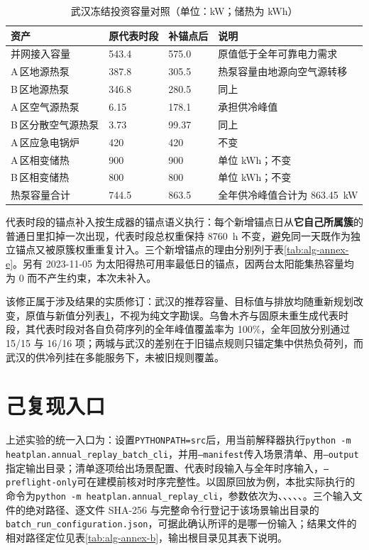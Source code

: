 \documentclass[12pt,a4paper]{article}
\begin{document}
\begin{table}[H]
\centering
\caption{武汉冻结投资容量对照（单位：kW；储热为 kWh）}
\label{tab:alg-annex-e2}
\small
\begin{tabularx}{\textwidth}{@{}p{}p{}p{}X@{}}
\toprule
资产 & 原代表时段 & 补锚点后 & 说明\\ \midrule
并网接入容量 & 543.4 & 575.0 & 原值低于全年可靠电力需求\\ \addlinespace
A\,区地源热泵 & 387.8 & 305.5 & 热泵容量由地源向空气源转移\\ \addlinespace
B\,区地源热泵 & 346.8 & 280.5 & 同上\\ \addlinespace
A\,区空气源热泵 & 6.15 & 178.1 & 承担供冷峰值\\ \addlinespace
B\,区分散空气源热泵 & 3.73 & 99.37 & 同上\\ \addlinespace
A\,区应急电锅炉 & 420 & 420 & 不变\\ \addlinespace
A\,区相变储热 & 900 & 900 & 单位 kWh；不变\\ \addlinespace
B\,区相变储热 & 800 & 800 & 单位 kWh；不变\\ \addlinespace
热泵容量合计 & 744.5 & 863.5 & 全年供冷峰值合计为 863.45~kW\\ \bottomrule
\end{tabularx}
\end{table}

代表时段的锚点补入按生成器的锚点语义执行：每个新增锚点日从\textbf{它自己所属簇}的普通日里扣掉一次出现，代表时段总权重保持 8760~h 不变，避免同一天既作为独立锚点又被原簇权重重复计入。三个新增锚点的理由分别列于表\ref{tab:alg-annex-e}。另有 2023-11-05 为太阳得热可用率最低日的锚点，因两台太阳能集热容量均为 0 而不产生约束，本次未补入。

该修正属于涉及结果的实质修订：武汉的推荐容量、目标值与排放均随重新规划改变，原值与新值分列表\ref{tab:alg-annex-e2}，不视为纯文字勘误。乌鲁木齐与固原未重生成代表时段，其代表时段对各自负荷序列的全年峰值覆盖率为 100\%，全年回放分别通过 15/15 与 16/16 项；两城与武汉的差别在于旧锚点规则只锚定集中供热负荷列，而武汉的供冷列挂在多能服务下，未被旧规则覆盖。

\section*{己\quad 复现入口}

上述实验的统一入口为：设置\texttt{PYTHONPATH=src}后，用当前解释器执行\texttt{python -m heatplan.annual\_replay\_batch\_cli}，并用\texttt{--manifest}传入场景清单、用\texttt{--output}指定输出目录；清单逐项给出场景配置、代表时段输入与全年时序输入，\texttt{--preflight-only}可在建模前核对时序完整性。以固原回放为例，本批实际执行的命令为\texttt{python -m heatplan.annual\_replay\_cli}，参数依次为、、、、、。三个输入文件的绝对路径、逐文件 SHA-256 与完整命令行登记于该场景输出目录的\texttt{batch\_run\_configuration.json}，可据此确认所评的是哪一份输入；结果文件的相对路径定位见表\ref{tab:alg-annex-b}，输出根目录见其表下说明。
\end{document}
